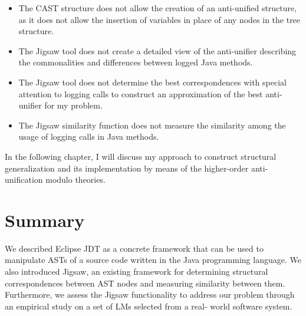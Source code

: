 \begin{itemize} [leftmargin=.5in]
\item The CAST structure does not allow the creation of an anti-unified structure, as it does not allow the insertion of variables in place of any nodes in the tree structure.
\item The Jigsaw tool does not create a detailed view of the anti-unifier describing the commonalities and differences between logged Java methods.
\item The Jigsaw tool does not determine the best correspondences with special attention to logging calls to construct an approximation of the best anti-unifier for my problem.
\item The Jigsaw similarity function does not measure the similarity among the usage of logging calls in Java methods.
\end{itemize}

In the following chapter, I will discuss my approach to construct structural generalization and its implementation by means of the higher-order anti-unification modulo theories.

\section{Summary}  \label{summary}
We described Eclipse JDT as a concrete framework that can be used  to manipulate ASTs of a source code written in the Java programming language. We also introduced Jigsaw, an existing framework for determining structural correspondences between AST nodes and measuring similarity between them. Furthermore, we assess the Jigsaw functionality to address our problem through an empirical study on a set of LMs selected from a real- world software system.





